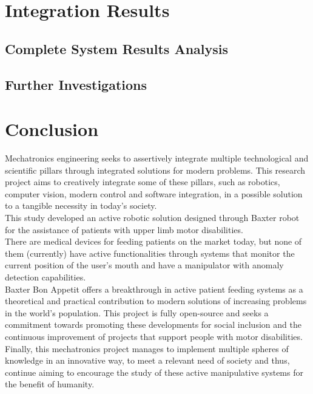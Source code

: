 \documentclass[11pt]{report} %
\begin{document}
\chapter{Integration Results}

\section{Complete System Results Analysis}

\section{Further Investigations}

\chapter{Conclusion}

Mechatronics engineering seeks to assertively integrate multiple technological and scientific pillars through integrated solutions for modern problems. This research project aims to creatively integrate some of these pillars, such as robotics, computer vision, modern control and software integration, in a possible solution to a tangible necessity in today's society.\\

This study developed an active robotic solution designed through Baxter robot for the assistance of patients with upper limb motor disabilities.\\

There are medical devices for feeding patients on the market today, but none of them (currently) have active functionalities through systems that monitor the current position of the user's mouth and have a manipulator with anomaly detection capabilities.\\

Baxter Bon Appetit offers a breakthrough in active patient feeding systems as a theoretical and practical contribution to modern solutions of increasing problems in the world's population. This project is fully open-source and seeks a commitment towards promoting these developments for social inclusion and the continuous improvement of projects that support people with motor disabilities.\\

Finally, this mechatronics project manages to implement multiple spheres of knowledge in an innovative way, to meet a relevant need of society and thus, continue aiming to encourage the study of these active manipulative systems for the benefit of humanity.\\
\end{document}
